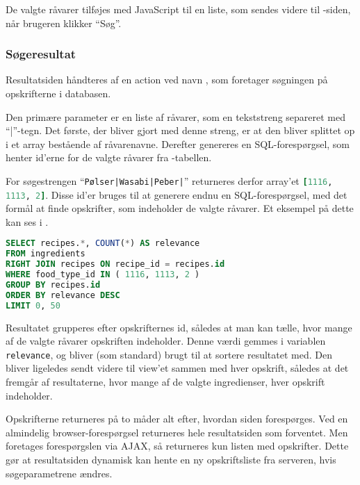 De valgte råvarer tilføjes med JavaScript til en liste, som sendes videre til -siden, når brugeren klikker ``Søg''.

\subsubsection{Søgeresultat}
Resultatsiden håndteres af en action ved navn , som foretager søgningen på opskrifterne i databasen. 

Den primære parameter er en liste af råvarer, som en tekststreng separeret med ``|''-tegn. Det første, der bliver gjort med denne streng, er at den bliver splittet op i et array bestående af råvarenavne. Derefter genereres en SQL-forespørgsel, som henter id'erne for de valgte råvarer fra -tabellen.

For søgestrengen ``\texttt{Pølser|Wasabi|Peber|}'' returneres derfor array'et \lstinline[language=Ruby]{[1116, 1113, 2]}. Disse id'er bruges til at generere endnu en SQL-forespørgsel, med det formål at finde opskrifter, som indeholder de valgte råvarer. Et eksempel på dette kan ses i .

\begin{lstlisting}[caption={Ved en søgning på ``Pølser'', ``Wasabi'' og ``Peber'' udføres denne SQL-forespørgsel.},label=lst:soegeresultat-sql,language=SQL]
SELECT recipes.*, COUNT(*) AS relevance
FROM ingredients
RIGHT JOIN recipes ON recipe_id = recipes.id
WHERE food_type_id IN ( 1116, 1113, 2 )
GROUP BY recipes.id
ORDER BY relevance DESC
LIMIT 0, 50
\end{lstlisting}

Resultatet grupperes efter opskrifternes id, således at man kan tælle, hvor mange af de valgte råvarer opskriften indeholder. Denne værdi gemmes i variablen \texttt{relevance}, og bliver (som standard) brugt til at sortere resultatet med. Den bliver ligeledes sendt videre til view'et sammen med hver opskrift, således at det fremgår af resultaterne, hvor mange af de valgte ingredienser, hver opskrift indeholder.

Opskrifterne returneres på to måder alt efter, hvordan siden forespørges. Ved en almindelig browser-forespørgsel returneres hele resultatsiden som forventet. Men foretages forespørgslen via AJAX, så returneres kun listen med opskrifter. Dette gør at resultatsiden dynamisk kan hente en ny opskriftsliste fra serveren, hvis \fx søgeparametrene ændres.
